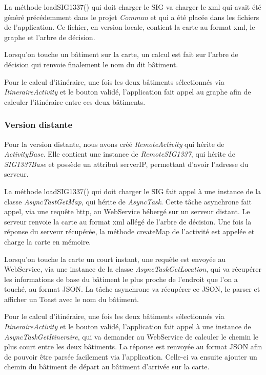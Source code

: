 La méthode loadSIG1337() qui doit charger le SIG va charger le xml qui avait été généré précédemment dans le projet \textit{Commun}
et qui a été placée dans les fichiers de l'application.
Ce fichier, en version locale, contient la carte au format xml, le graphe et l'arbre de décision.

Lorsqu'on touche un bâtiment sur la carte, un calcul est fait sur l'arbre de décision qui renvoie finalement le nom du dit bâtiment.

Pour le calcul d'itinéraire, une fois les deux bâtiments sélectionnés via \textit{ItineraireActivity} et le bouton validé,
l'application fait appel au graphe afin de calculer l'itinéraire entre ces deux bâtiments.


\subsubsection{Version distante}

Pour la version distante, nous avons créé \textit{RemoteActivity} qui hérite de \textit{ActivityBase}.
Elle contient une instance de \textit{RemoteSIG1337}, qui hérite de \textit{SIG1337Base} et possède un attribut serverIP,
permettant d'avoir l'adresse du serveur.

La méthode loadSIG1337() qui doit charger le SIG fait appel à une instance de la classe \textit{AsyncTastGetMap},
qui hérite de \textit{AsyncTask}.
Cette tâche asynchrone fait appel, via une requête http, au WebService hébergé sur un serveur distant.
Le serveur renvoie la carte au format xml allégé de l'arbre de décision.
Une fois la réponse du serveur récupérée, la méthode createMap de l'activité est appelée et charge la carte en mémoire.

Lorsqu'on touche la carte un court instant, une requête est envoyée au WebService,
via une instance de la classe \textit{AsyncTaskGetLocation},
qui va récupérer les informations de base du bâtiment le plus proche de l'endroit que l'on a touché, au format JSON.
La tâche asynchrone va récupérer ce JSON, le parser et afficher un Toast avec le nom du bâtiment.

Pour le calcul d'itinéraire, une fois les deux bâtiments sélectionnés via \textit{ItineraireActivity} et le bouton validé,
l'application fait appel à une instance de \textit{AsyncTaskGetItineraire},
qui va demander au WebService de calculer le chemin le plus court entre les deux bâtiments.
La réponse est renvoyée au format JSON afin de pouvoir être parsée facilement via l'application.
Celle-ci va ensuite ajouter un chemin du bâtiment de départ au bâtiment d'arrivée sur la carte.


